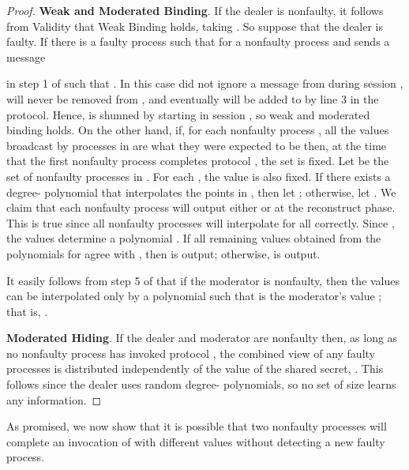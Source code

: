 \documentclass{sig-alternate}
\newcommand{\mwdavss}{\text{MW-SVSS}\xspace}
\begin{document}
\begin{proof}
\textbf{Weak and Moderated Binding}.
If the dealer is nonfaulty, it follows from Validity that Weak Binding
holds, taking .
So suppose that the dealer  is faulty.
If there is
a faulty process  such that  for a nonfaulty process  and  sends a message

in step 1 of 
such that . In this case  did not ignore a message from  during session
,  will never be removed from , and
eventually  will be added to 
by line 3 in the  protocol.
Hence,  is shunned by  starting in session ,
so weak and moderated binding holds.
On the other hand,
if,
for each nonfaulty process , all the values broadcast by processes in 
are what they were expected to be
then, at the time that the first nonfaulty process
completes protocol ,
the set  is fixed.
Let  be the set of nonfaulty processes in
. For each , the value  is also
fixed. If there exists a degree- polynomial  that interpolates the
points in
, then let
; otherwise, let .
We claim that each nonfaulty process will output either  or  at
the reconstruct phase. This is true since all nonfaulty processes will
interpolate  for all  correctly. Since
, the values  determine a polynomial . If all remaining values
 obtained from the polynomials  for  agree with , then  is
output;  otherwise,   is output.

It easily follows from step 5 of
 that
if the moderator is nonfaulty, then
the values  can be interpolated only by a polynomial  such that  is the moderator's value ; that is, .


\textbf{Moderated Hiding}.   If the dealer and moderator are nonfaulty
then, as long as no nonfaulty process has invoked protocol ,
the combined view of any  faulty processes is distributed
independently of the value of the shared secret, .
This follows since the dealer uses random degree- polynomials,
so no set of size  learns any information.
\end{proof}




As promised, we now show that it is possible that two nonfaulty
processes will complete an invocation of \mwdavss with different values
without detecting a new faulty process.
\end{document}
